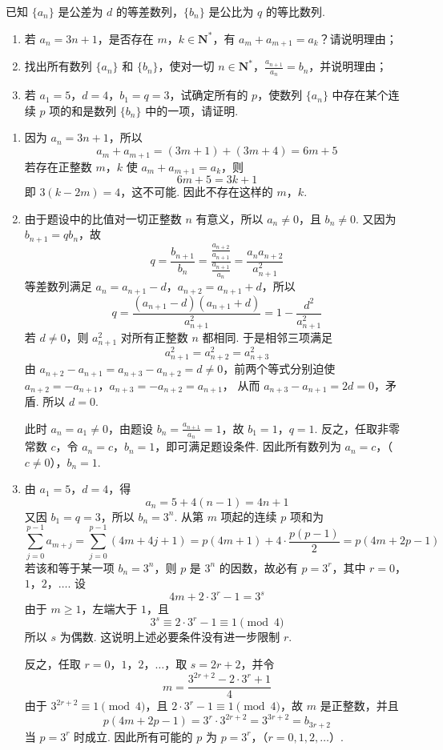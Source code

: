 \begin{problem}
已知 \(\{a_n\}\) 是公差为 \(d\) 的等差数列，\(\{b_n\}\) 是公比为 \(q\) 的等比数列.

\begin{enumerate}
\item 若 \(a_n = 3n + 1\)，是否存在 \(m\)，\(k \in \mathbf{N}^*\)，有 \(a_m + a_{m+1} = a_k\)？请说明理由；

\item 找出所有数列 \(\{a_n\}\) 和 \(\{b_n\}\)，使对一切 \(n \in \mathbf{N}^*\)，\(\frac{a_{n+1}}{a_n} = b_n\)，并说明理由；

\item 若 \(a_1 = 5\)，\(d = 4\)，\(b_1 = q = 3\)，试确定所有的 \(p\)，使数列 \(\{a_n\}\) 中存在某个连续 \(p\) 项的和是数列 \(\{b_n\}\) 中的一项，请证明.
\end{enumerate}
\end{problem}

\begin{solution}
\begin{enumerate}
\item 因为 \(a_n=3n+1\)，所以
\[
a_m+a_{m+1}=(3m+1)+(3m+4)=6m+5
\]
若存在正整数 \(m\)，\(k\) 使 \(a_m+a_{m+1}=a_k\)，则
\[
6m+5=3k+1
\]
即 \(3(k-2m)=4\)，这不可能. 因此不存在这样的 \(m\)，\(k\).

\item 由于题设中的比值对一切正整数 \(n\) 有意义，所以 \(a_n\neq0\)，且 \(b_n\neq0\). 又因为 \(b_{n+1}=qb_n\)，故
\[
q=\frac{b_{n+1}}{b_n}=\frac{\frac{a_{n+2}}{a_{n+1}}}{\frac{a_{n+1}}{a_n}}=\frac{a_na_{n+2}}{a_{n+1}^2}
\]
等差数列满足 \(a_n=a_{n+1}-d\)，\(a_{n+2}=a_{n+1}+d\)，所以
\[
q=\frac{(a_{n+1}-d)(a_{n+1}+d)}{a_{n+1}^2}=1-\frac{d^2}{a_{n+1}^2}
\]
若 \(d\neq0\)，则 \(a_{n+1}^2\) 对所有正整数 \(n\) 都相同. 于是相邻三项满足
\[
a_{n+1}^2=a_{n+2}^2=a_{n+3}^2
\]
由 \(a_{n+2}-a_{n+1}=a_{n+3}-a_{n+2}=d\neq0\)，前两个等式分别迫使
\(a_{n+2}=-a_{n+1}\)，\(a_{n+3}=-a_{n+2}=a_{n+1}\)，
从而 \(a_{n+3}-a_{n+1}=2d=0\)，矛盾. 所以 \(d=0\).

此时 \(a_n=a_1\neq0\)，由题设 \(b_n=\frac{a_{n+1}}{a_n}=1\)，故 \(b_1=1\)，\(q=1\). 反之，任取非零常数 \(c\)，令 \(a_n=c\)，\(b_n=1\)，即可满足题设条件. 因此所有数列为
\(a_n=c\)，（\(c\neq0\)），\(b_n=1\).

\item 由 \(a_1=5\)，\(d=4\)，得
\[
a_n=5+4(n-1)=4n+1
\]
又因 \(b_1=q=3\)，所以 \(b_n=3^n\). 从第 \(m\) 项起的连续 \(p\) 项和为
\[
\sum_{j=0}^{p-1}a_{m+j}=\sum_{j=0}^{p-1}(4m+4j+1)=p(4m+1)+4\cdot\frac{p(p-1)}{2}=p(4m+2p-1)
\]
若该和等于某一项 \(b_n=3^n\)，则 \(p\) 是 \(3^n\) 的因数，故必有 \(p=3^r\)，其中 \(r=0\)，\(1\)，\(2\)，\(\ldots\). 设
\[
4m+2\cdot3^r-1=3^s
\]
由于 \(m\geqslant1\)，左端大于 \(1\)，且
\[
3^s\equiv2\cdot3^r-1\equiv1\pmod 4
\]
所以 \(s\) 为偶数. 这说明上述必要条件没有进一步限制 \(r\).

反之，任取 \(r=0\)，\(1\)，\(2\)，\(\ldots\)，取 \(s=2r+2\)，并令
\[
m=\frac{3^{2r+2}-2\cdot3^r+1}{4}
\]
由于 \(3^{2r+2}\equiv1\pmod4\)，且 \(2\cdot3^r-1\equiv1\pmod4\)，故 \(m\) 是正整数，并且
\[
p(4m+2p-1)=3^r\cdot3^{2r+2}=3^{3r+2}=b_{3r+2}
\]
当 \(p=3^r\) 时成立. 因此所有可能的 \(p\) 为
\(p=3^r\)，（\(r=0,1,2,\ldots\)）.
\end{enumerate}
\end{solution}
